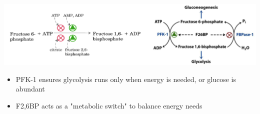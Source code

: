 \documentclass[10pt]{article}
\begin{document}
\begin{center} 
	\includegraphics*[width=\textwidth]{L2_3.png}
\end{center}
\begin{itemize}
	\item PFK-1 ensures glycolysis runs only when energy is needed, or glucose is abundant
	\item F2,6BP acts as a "metabolic switch" to balance energy needs
\end{itemize}
\end{document}
